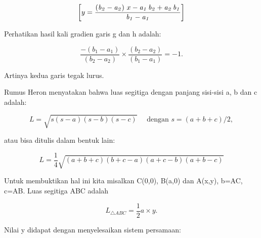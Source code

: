 \documentclass{article}
\begin{document}
\begin{eulernotebook}
\begin{eulercomment}
\begin{eulercomment}
\begin{eulercomment}
\begin{eulercomment}
\begin{eulerformula}
\[
\left[ y=\frac{\left({\it b_2}-{\it a_2}\right)\,x-{\it a_1}\,
 {\it b_2}+{\it a_2}\,{\it b_1}}{{\it b_1}-{\it a_1}} \right] 
\]
\end{eulerformula}
\begin{eulercomment}
Perhatikan hasil kali gradien garis g dan h adalah:

\end{eulercomment}
\begin{eulerformula}
\[
\frac{-(b_1-a_1)}{(b_2-a_2)}\times \frac{(b_2-a_2)}{(b_1-a_1)} = -1.
\]
\end{eulerformula}
\begin{eulercomment}
Artinya kedua garis tegak lurus.
\end{eulercomment}
\begin{eulercomment}
Rumus Heron menyatakan bahwa luas segitiga dengan panjang sisi-sisi a,
b dan c adalah:

\end{eulercomment}
\begin{eulerformula}
\[
L = \sqrt{s(s-a)(s-b)(s-c)}\quad \text{ dengan } s=(a+b+c)/2,
\]
\end{eulerformula}
\begin{eulercomment}
atau bisa ditulis dalam bentuk lain:

\end{eulercomment}
\begin{eulerformula}
\[
L = \frac{1}{4}\sqrt{(a+b+c)(b+c-a)(a+c-b)(a+b-c)}
\]
\end{eulerformula}
\begin{eulercomment}
Untuk membuktikan hal ini kita misalkan C(0,0), B(a,0) dan A(x,y),
b=AC, c=AB. Luas segitiga ABC adalah

\end{eulercomment}
\begin{eulerformula}
\[
L_{\triangle ABC}=\frac{1}{2}a\times y.
\]
\end{eulerformula}
\begin{eulercomment}
Nilai y didapat dengan menyelesaikan sistem persamaan:


\end{eulercomment}
\end{eulercomment}
\end{eulercomment}
\end{eulercomment}
\end{eulercomment}
\end{eulernotebook}
\end{document}
